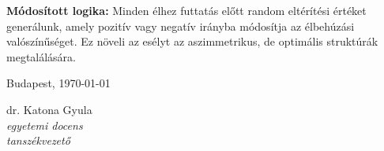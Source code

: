 \documentclass[12pt,a4paper]{article}
\begin{document}
\textbf{Módosított logika:} Minden élhez futtatás előtt random eltérítési értéket generálunk, amely pozitív vagy negatív irányba módosítja az élbehúzási valószínűséget. Ez növeli az esélyt az aszimmetrikus, de optimális struktúrák megtalálására.


\vspace{1cm}\vfill
Budapest, \today
\begin{flushright}
\begin{minipage}{0.5\textwidth}
\begin{center}
	dr. Katona Gyula\\
	\textit{egyetemi docens}\\
	\textit{tanszékvezető}
\end{center}
\end{minipage}
\end{flushright}
\vfill
\end{document}
